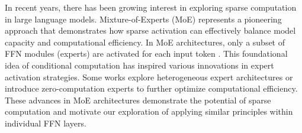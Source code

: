 In recent years, there has been growing interest in exploring sparse computation in large language models. Mixture-of-Experts (MoE) represents a pioneering approach that demonstrates how sparse activation can effectively balance model capacity and computational efficiency. In MoE architectures, only a subset of FFN modules (experts) are activated for each input token \cite{fedus2022switch, DBLP:conf/iclr/LepikhinLXCFHKS21, DBLP:journals/corr/abs-2403-07652}. This foundational idea of conditional computation has inspired various innovations in expert activation strategies. Some works explore heterogeneous expert architectures \cite{sun2024hunyuan} or introduce zero-computation experts \cite{jin2024moe++} to further optimize computational efficiency. These advances in MoE architectures demonstrate the potential of sparse computation and motivate our exploration of applying similar principles within individual FFN layers.